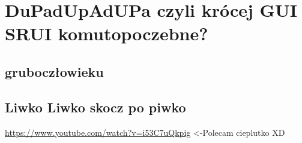 \chapter{DuPadUpAdUPa czyli krócej GUI SRUI komutopoczebne?}
\section{gruboczłowieku}
\section{Liwko Liwko skocz po piwko}
\url{https://www.youtube.com/watch?v=i53C7uQkpig} <-Polecam cieplutko XD
